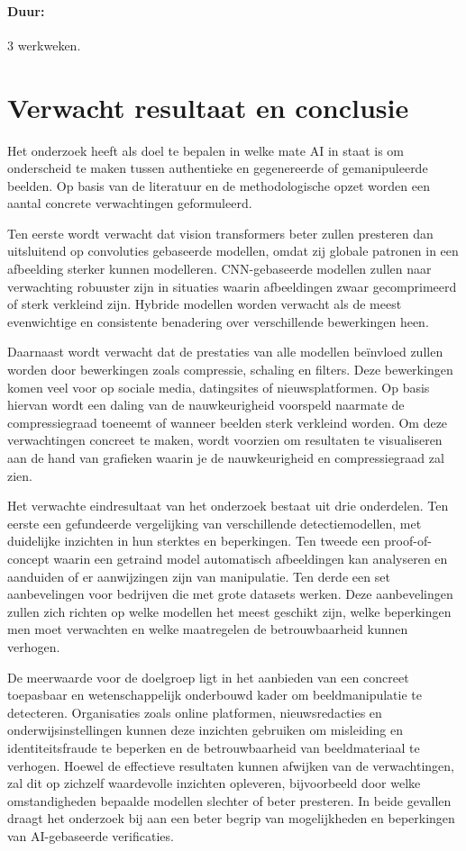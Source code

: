 \documentclass{hogent-article}
\begin{document}
\paragraph{Duur:} 3 werkweken.

\section{Verwacht resultaat en conclusie}
\label{sec:verwachte_resultaten}
Het onderzoek heeft als doel te bepalen in welke mate AI in staat is om onderscheid te maken tussen authentieke en gegenereerde of gemanipuleerde beelden. Op basis van de literatuur en de methodologische opzet worden een aantal concrete verwachtingen geformuleerd.

Ten eerste wordt verwacht dat vision transformers beter zullen presteren dan uitsluitend op convoluties gebaseerde modellen, omdat zij globale patronen in een afbeelding sterker kunnen modelleren. CNN-gebaseerde modellen zullen naar verwachting robuuster zijn in situaties waarin afbeeldingen zwaar gecomprimeerd of sterk verkleind zijn. Hybride modellen worden verwacht als de meest evenwichtige en consistente benadering over verschillende bewerkingen heen.

Daarnaast wordt verwacht dat de prestaties van alle modellen beïnvloed zullen worden door bewerkingen zoals compressie, schaling en filters. Deze bewerkingen komen veel voor op sociale media, datingsites of nieuwsplatformen. Op basis hiervan wordt een daling van de nauwkeurigheid voorspeld naarmate de compressiegraad toeneemt of wanneer beelden sterk verkleind worden. Om deze verwachtingen concreet te maken, wordt voorzien om resultaten te visualiseren aan de hand van grafieken waarin je de nauwkeurigheid en compressiegraad zal zien.

Het verwachte eindresultaat van het onderzoek bestaat uit drie onderdelen. Ten eerste een gefundeerde vergelijking van verschillende detectiemodellen, met duidelijke inzichten in hun sterktes en beperkingen. Ten tweede een proof-of-concept waarin een getraind model automatisch afbeeldingen kan analyseren en aanduiden of er aanwijzingen zijn van manipulatie. Ten derde een set aanbevelingen voor bedrijven die met grote datasets werken. Deze aanbevelingen zullen zich richten op welke modellen het meest geschikt zijn, welke beperkingen men moet verwachten en welke maatregelen de betrouwbaarheid kunnen verhogen.

De meerwaarde voor de doelgroep ligt in het aanbieden van een concreet toepasbaar en wetenschappelijk onderbouwd kader om beeldmanipulatie te detecteren. Organisaties zoals online platformen, nieuwsredacties en onderwijsinstellingen kunnen deze inzichten gebruiken om misleiding en identiteitsfraude te beperken en de betrouwbaarheid van beeldmateriaal te verhogen. Hoewel de effectieve resultaten kunnen afwijken van de verwachtingen, zal dit op zichzelf waardevolle inzichten opleveren, bijvoorbeeld door welke omstandigheden bepaalde modellen slechter of beter presteren. In beide gevallen draagt het onderzoek bij aan een beter begrip van mogelijkheden en beperkingen van AI-gebaseerde verificaties.





\printbibliography[heading=bibintoc]
\end{document}
